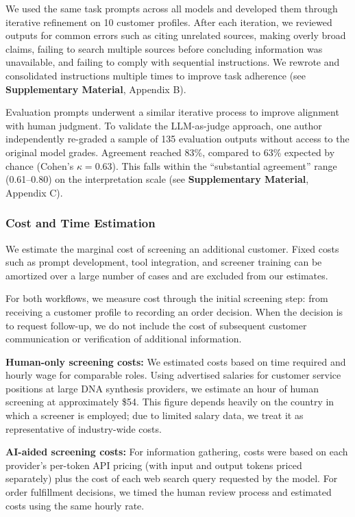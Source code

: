 \documentclass[utf8]{FrontiersinHarvard}
\begin{document}
We used the same task prompts across all models and developed them through iterative refinement on 10 customer profiles. After each iteration, we reviewed outputs for common errors such as citing unrelated sources, making overly broad claims, failing to search multiple sources before concluding information was unavailable, and failing to comply with sequential instructions. We rewrote and consolidated instructions multiple times to improve task adherence (see \textbf{Supplementary Material}, Appendix B).

Evaluation prompts underwent a similar iterative process to improve alignment with human judgment. To validate the LLM-as-judge approach, one author independently re-graded a sample of 135 evaluation outputs without access to the original model grades. Agreement reached 83\%, compared to 63\% expected by chance (Cohen's $\kappa = 0.63$). This falls within the ``substantial agreement'' range (0.61--0.80) on the \citet{LandisKoch1977} interpretation scale (see \textbf{Supplementary Material}, Appendix C).

\subsubsection{Cost and Time Estimation}

We estimate the marginal cost of screening an additional customer. Fixed costs such as prompt development, tool integration, and screener training can be amortized over a large number of cases and are excluded from our estimates.

For both workflows, we measure cost through the initial screening step: from receiving a customer profile to recording an order decision. When the decision is to request follow-up, we do not include the cost of subsequent customer communication or verification of additional information.

\textbf{Human-only screening costs:} We estimated costs based on time required and hourly wage for comparable roles. Using advertised salaries for customer service positions at large DNA synthesis providers, we estimate an hour of human screening at approximately \$54. This figure depends heavily on the country in which a screener is employed; due to limited salary data, we treat it as representative of industry-wide costs.

\textbf{AI-aided screening costs:} For information gathering, costs were based on each provider's per-token API pricing (with input and output tokens priced separately) plus the cost of each web search query requested by the model. For order fulfillment decisions, we timed the human review process and estimated costs using the same hourly rate.
\end{document}
